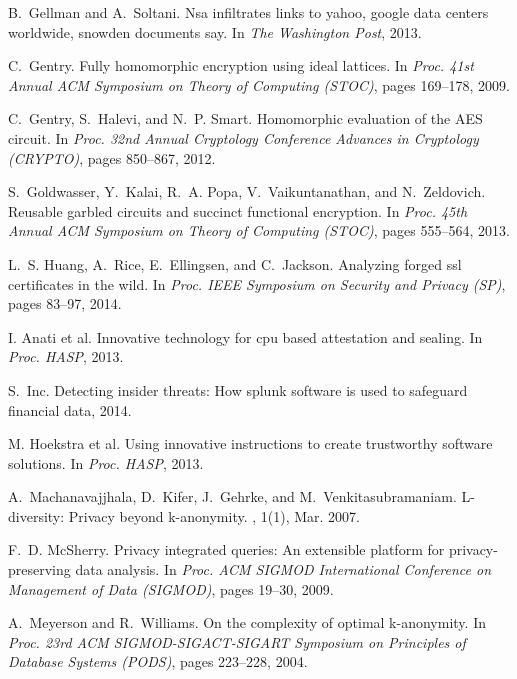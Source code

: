 \documentclass{sig-alternate-10pt}
\begin{document}
{\begin{thebibliography}{10}
B.~Gellman and A.~Soltani.
\newblock Nsa infiltrates links to yahoo, google data centers worldwide,
  snowden documents say.
\newblock In {\em The Washington Post}, 2013.

C.~Gentry.
\newblock Fully homomorphic encryption using ideal lattices.
\newblock In {\em Proc. 41st Annual ACM Symposium on Theory of Computing
  (STOC)}, pages 169--178, 2009.

C.~Gentry, S.~Halevi, and N.~P. Smart.
\newblock Homomorphic evaluation of the {AES} circuit.
\newblock In {\em Proc. 32nd Annual Cryptology Conference Advances in
  Cryptology (CRYPTO)}, pages 850--867, 2012.

S.~Goldwasser, Y.~Kalai, R.~A. Popa, V.~Vaikuntanathan, and N.~Zeldovich.
\newblock Reusable garbled circuits and succinct functional encryption.
\newblock In {\em Proc. 45th Annual ACM Symposium on Theory of Computing
  (STOC)}, pages 555--564, 2013.

L.~S. Huang, A.~Rice, E.~Ellingsen, and C.~Jackson.
\newblock Analyzing forged ssl certificates in the wild.
\newblock In {\em Proc. IEEE Symposium on Security and Privacy (SP)}, pages
  83--97, 2014.

{I. Anati et al.}
\newblock Innovative technology for cpu based attestation and sealing.
\newblock In {\em Proc. HASP}, 2013.

S.~Inc.
\newblock Detecting insider threats: How splunk software is used to safeguard
  financial data, 2014.

{M. Hoekstra et al.}
\newblock Using innovative instructions to create trustworthy software
  solutions.
\newblock In {\em Proc. HASP}, 2013.

A.~Machanavajjhala, D.~Kifer, J.~Gehrke, and M.~Venkitasubramaniam.
\newblock L-diversity: Privacy beyond k-anonymity.
, 1(1), Mar. 2007.

F.~D. McSherry.
\newblock Privacy integrated queries: An extensible platform for
  privacy-preserving data analysis.
\newblock In {\em Proc. ACM SIGMOD International Conference on Management of
  Data (SIGMOD)}, pages 19--30, 2009.

A.~Meyerson and R.~Williams.
\newblock On the complexity of optimal k-anonymity.
\newblock In {\em Proc. 23rd ACM SIGMOD-SIGACT-SIGART Symposium on Principles
  of Database Systems (PODS)}, pages 223--228, 2004.


\end{thebibliography}}
\end{document}
